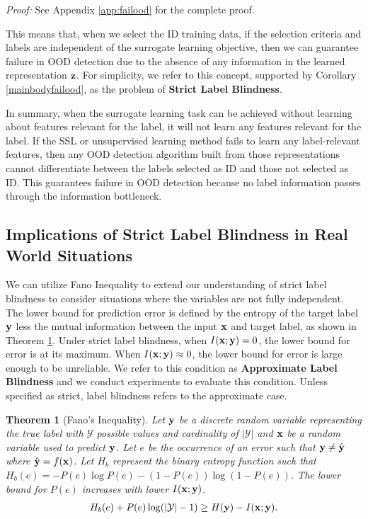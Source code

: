 \documentclass[11pt, oneside]{book}
\theoremstyle{plain}
\newtheorem{theorem}{Theorem}[section]
\theoremstyle{definition}
\theoremstyle{remark}
\begin{document}
\textit{Proof:} See Appendix \ref{app:failood} for the complete proof.

This means that, when we select the ID training data, if the selection criteria and labels are independent of the surrogate learning objective, then we can guarantee failure in OOD detection due to the absence of any information in the learned representation ${\mathbf{z}}$. For simplicity, we refer to this concept, supported by Corollary \ref{mainbodyfailood}, as the problem of \textbf{Strict Label Blindness}.

In summary, when the surrogate learning task can be achieved without learning about features relevant for the label, it will not learn any features relevant for the label. If the SSL or unsupervised learning method fails to learn any label-relevant features, then any OOD detection algorithm built from those representations cannot differentiate between the labels selected as ID and those not selected as ID. This guarantees failure in OOD detection because no label information passes through the information bottleneck.

\subsection{Implications of Strict Label Blindness in Real World Situations}

We can utilize Fano Inequality to extend our understanding of strict label blindness to consider situations where the variables are not fully independent. The lower bound for prediction error is defined by the entropy of the target label ${\mathbf{y}}$ less the mutual information between the input ${\mathbf{x}}$ and target label, as shown in Theorem \ref{fano}. Under strict label blindness, when $I({\mathbf{x}};{\mathbf{y}}) = 0$, the lower bound for error is at its maximum. When $I({\mathbf{x}};{\mathbf{y}}) \approx 0$, the lower bound for error is large enough to be unreliable. We refer to this condition as \textbf{Approximate Label Blindness} and we conduct experiments to evaluate this condition. Unless specified as strict, label blindness refers to the approximate case.

\begin{theorem}[Fano's Inequality]
Let ${\mathbf{y}}$ be a discrete random variable representing the true label with $\mathcal{Y}$ possible values and cardinality of $|\mathcal{Y}|$ and ${\mathbf{x}}$ be a random variable used to predict ${\mathbf{y}}$. Let $e$ be the occurrence of an error such that ${\mathbf{y}} \neq \hat{{\mathbf{y}}}$ where $\hat{{\mathbf{y}}} = f({\mathbf{x}})$. Let $H_b$ represent the binary entropy function such that $H_b(e)=-P(e) \log P(e)-(1-P(e)) \log (1-P(e))$. The lower bound for $P(e)$ increases with lower $I({\mathbf{x}};{\mathbf{y}})$.
\begin{align}
H_b(e) + P(e) \log(| \mathcal{Y} |-1) \geq H({\mathbf{y}}) - I({\mathbf{x}}; {\mathbf{y}}).
\end{align}
\label{fano}
\end{theorem}
\end{document}
